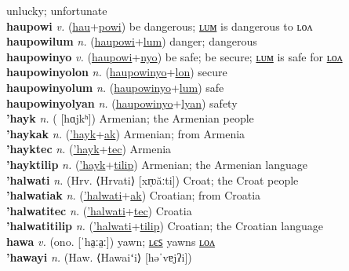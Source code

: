 unlucky; unfortunate \label{hautikulon} \\
\textbf{haupowi} \textit{v.} (\hyperref[hau]{hau}+\hyperref[powi]{powi})
be dangerous; \hyperref[haupowilum]{ʟᴜᴍ} is dangerous to ʟᴏᴧ \label{haupowi} \\
\textbf{haupowilum} \textit{n.} (\hyperref[haupowi]{haupowi}+\hyperref[lum]{lum})
danger; dangerous \label{haupowilum} \\
\textbf{haupowinyo} \textit{v.} (\hyperref[haupowi]{haupowi}+\hyperref[nyo]{nyo})
be safe; be secure; \hyperref[haupowinyolum]{ʟᴜᴍ} is safe for \hyperref[haupowinyolon]{ʟᴏᴧ} \label{haupowinyo} \\
\textbf{haupowinyolon} \textit{n.} (\hyperref[haupowinyo]{haupowinyo}+\hyperref[lon]{lon})
secure \label{haupowinyolon} \\
\textbf{haupowinyolum} \textit{n.} (\hyperref[haupowinyo]{haupowinyo}+\hyperref[lum]{lum})
safe \label{haupowinyolum} \\
\textbf{haupowinyolyan} \textit{n.} (\hyperref[haupowinyo]{haupowinyo}+\hyperref[lyan]{lyan})
safety \label{haupowinyolyan} \\
\textbf{'hayk} \textit{n.} ( [hɑjkʰ])
Armenian; the Armenian people \label{'hayk} \\
\textbf{'haykak} \textit{n.} (\hyperref['hayk]{'hayk}+\hyperref[ak]{ak})
Armenian; from Armenia \label{'haykak} \\
\textbf{'hayktec} \textit{n.} (\hyperref['hayk]{'hayk}+\hyperref[tec]{tec})
Armenia \label{'hayktec} \\
\textbf{'hayktilip} \textit{n.} (\hyperref['hayk]{'hayk}+\hyperref[tilip]{tilip})
Armenian; the Armenian language \label{'hayktilip} \\
\textbf{'halwati} \textit{n.} (Hrv. ⟨Hrvati⟩ [xr̩ʋăːti])
Croat; the Croat people \label{'halwati} \\
\textbf{'halwatiak} \textit{n.} (\hyperref['halwati]{'halwati}+\hyperref[ak]{ak})
Croatian; from Croatia \label{'halwatiak} \\
\textbf{'halwatitec} \textit{n.} (\hyperref['halwati]{'halwati}+\hyperref[tec]{tec})
Croatia \label{'halwatitec} \\
\textbf{'halwatitilip} \textit{n.} (\hyperref['halwati]{'halwati}+\hyperref[tilip]{tilip})
Croatian; the Croatian language \label{'halwatitilip} \\
\textbf{hawa} \textit{v.} (ono. [ˈha̤ːa̤ː])
yawn; \hyperref[hawales]{ʟєꜱ} yawns \hyperref[hawalon]{ʟᴏᴧ} \label{hawa} \\
\textbf{'hawayi} \textit{n.} (Haw. ⟨Hawaiʻi⟩ [həˈvɐjʔi])
